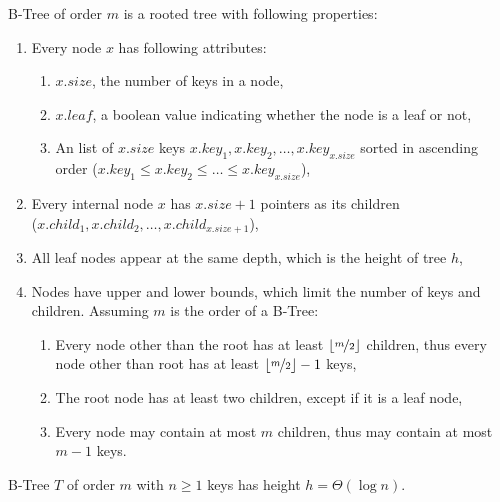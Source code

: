 \begin{definition}\label{def:btree}
  B-Tree of order $m$ is a rooted tree with following properties:
  \begin{enumerate}
    \item Every node $x$ has following attributes:
          \begin{enumerate}
            \item $x.\mathit{size}$, the number of keys in a node,
            \item $x.\mathit{leaf}$, a boolean value indicating whether the node is a leaf or not,
            \item An list of $x.\mathit{size}$ keys $x.\mathit{key}_1, x.\mathit{key}_2, \dots, x.\mathit{key}_{x.size}$ sorted in ascending order ($x.\mathit{key}_1 \le x.\mathit{key}_2 \le \dots \le x.\mathit{key}_{x.\mathit{size}}$),
          \end{enumerate}
    \item Every internal node $x$ has $x.size + 1$ pointers as its children \\($x.child_1, x.child_2, \dots, x.child_{x.size + 1}$),
    \item All leaf nodes appear at the same depth, which is the height of tree $h$,
    \item Nodes have upper and lower bounds, which limit the number of keys and children. Assuming $m$ is the order of a B-Tree:
          \begin{enumerate}
            \item Every node other than the root has at least $\lfloor\nicefrac{m}{2}\rfloor$ children, thus every node other than root has at least $\lfloor\nicefrac{m}{2}\rfloor - 1$ keys,
            \item The root node has at least two children, except if it is a leaf node,
            \item Every node may contain at most $m$ children, thus may contain at most $m - 1$ keys.
          \end{enumerate}
  \end{enumerate}
\end{definition}

\begin{lemma}
  B-Tree $T$ of order $m$ with $n \ge 1$ keys has height $h = \Theta(\log{n})$.
\end{lemma}

